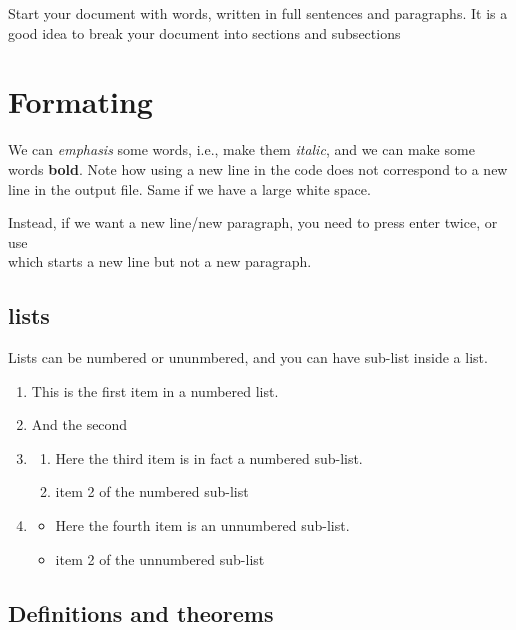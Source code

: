 \documentclass[a4paper,11pt]{article}
\theoremstyle{definition}
\begin{document}
Start your document with words, written in full sentences and paragraphs.
It is a good idea to break your document into sections and subsections

\section{Formating}

We can \emph{emphasis} some words, i.e., make them \emph{italic}, and we can make some words \textbf{bold}.
Note how using a new line in the code does not correspond to a new line in the output file.
Same if we have        a           large                white                   space.

Instead, if we want a new line/new paragraph, you need to press enter twice, or use \\
which starts a new line but not a new paragraph.

\subsection{lists}

Lists can be numbered or ununmbered, and you can have sub-list inside a list.

\begin{enumerate}
	\item This is the first item in a numbered list.

	\item And the second
	
	\item 
	\begin{enumerate}
		\item Here the third item is in fact a numbered sub-list.
		\item item 2 of the numbered sub-list
	\end{enumerate}

	\item 
	\begin{itemize}
		\item Here the fourth item is an unnumbered sub-list.
		\item item 2 of the unnumbered sub-list
	\end{itemize}
\end{enumerate}

\subsection{Definitions and theorems}
\end{document}
